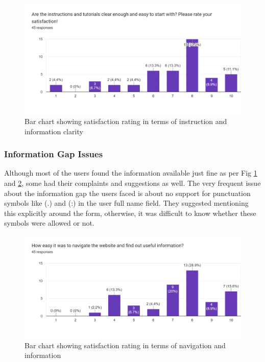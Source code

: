 \begin{figure}[ht]
\centering
\centerline{\includegraphics[width=\linewidth]{Figures/instructions.png}}
\vspace{-10pt}\caption{Bar chart showing satisfaction rating in terms of instruction and information clarity}
\label{fig:instruction}
\end{figure}

\subsubsection{Information Gap Issues}

Although most of the users found the information available just fine as per Fig \ref{fig:instruction} and \ref{fig:navigation}, some had their complaints and suggestions as well. The very frequent issue about the information gap the users faced is about no support for punctuation symbols like (.) and (:) in the user full name field. They suggested mentioning this explicitly around the form, otherwise, it was difficult to know whether these symbols were allowed or not. 


\begin{figure}[ht]
\centering
\centerline{\includegraphics[width=\linewidth]{Figures/navigation.png}}
\vspace{-10pt}\caption{Bar chart showing satisfaction rating in terms of navigation and information}
\label{fig:navigation}
\end{figure}

